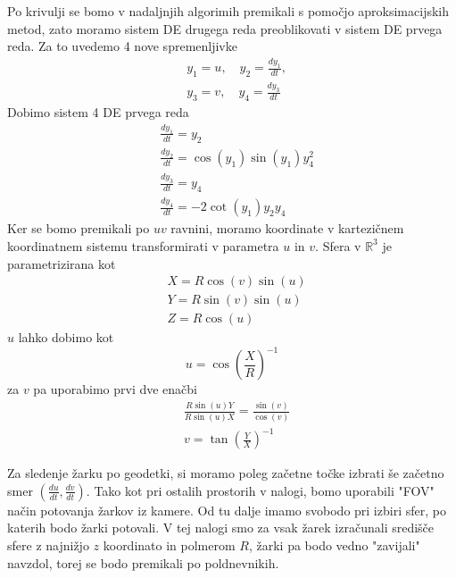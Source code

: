 \documentclass[titlepage]{article}
\begin{document}
Po krivulji se bomo v nadaljnjih algorimih premikali s pomočjo aproksimacijskih metod, zato moramo sistem DE drugega reda preoblikovati v
sistem DE prvega reda. Za to uvedemo 4 nove spremenljivke
\begin{equation}
\begin{split}
    &y_{1}=u, \quad y_{2}=\frac{dy_{1}}{dt}, \\
    &y_{3}=v, \quad y_{4}=\frac{dy_{3}}{dt}
\end{split}
\end{equation}
Dobimo sistem 4 DE prvega reda
\begin{equation} \label{e:geoSys}
\begin{split}
    &\frac{dy_{1}}{dt}=y_{2} \\
    &\frac{dy_{2}}{dt}=\cos(y_{1})\sin(y_{1})y^{2}_{4} \\
    &\frac{dy_{3}}{dt}=y_{4} \\
    &\frac{dy_{4}}{dt}=-2\cot(y_{1})y_{2}y_{4}
\end{split}
\end{equation}
Ker se bomo premikali po $uv$ ravnini, moramo koordinate v kartezičnem koordinatnem sistemu transformirati v parametra $u$ in $v$. Sfera v $\mathbb{R}^3$ je
parametrizirana kot
\begin{equation} \label{e:toXYZ}
    \begin{split}
        &X=R\cos(v)\sin(u) \\
        &Y=R\sin(v)\sin(u) \\
        &Z=R\cos(u)
    \end{split}
\end{equation}
$u$ lahko dobimo kot
\begin{equation} \label{e:toU}
        u=\cos \left( \frac{X}{R} \right)^{-1}
\end{equation}
za $v$ pa uporabimo prvi dve enačbi
\begin{equation} \label{e:toV}
    \begin{split}
        &\frac{R\sin(u)Y}{R\sin(u)X}=\frac{\sin(v)}{\cos(v)} \\
        &v=\tan \left(\frac{Y}{X} \right)^{-1}
    \end{split}
\end{equation}

Za sledenje žarku po geodetki, si moramo poleg začetne točke izbrati še začetno smer
$\left( \frac{du}{dt}, \frac{dv}{dt} \right)$. Tako kot pri ostalih prostorih v nalogi, bomo uporabili "FOV" način
potovanja žarkov iz kamere. Od tu dalje imamo svobodo pri izbiri sfer, po katerih bodo žarki potovali. V tej nalogi smo za
vsak žarek izračunali središče sfere z najnižjo $z$ koordinato in polmerom $R$, žarki pa bodo vedno "zavijali" navzdol, torej se bodo premikali po poldnevnikih.
\end{document}
